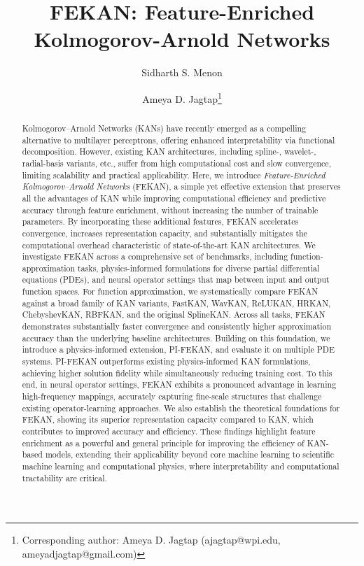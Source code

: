 \documentclass{article}
\title{\textbf{FEKAN: Feature-Enriched Kolmogorov-Arnold Networks}}
\author[]{Sidharth S. Menon}
\author[]{Ameya D. Jagtap\thanks{Corresponding author: Ameya D. Jagtap (ajagtap@wpi.edu, ameyadjagtap@gmail.com)}}
\affil[]{\textit{\small{Aerospace Engineering Department, Worcester Polytechnic Institute, Worcester, MA 01609, USA.}}}
\date{}
\begin{document}
\maketitle
\begin{abstract}
Kolmogorov–Arnold Networks (KANs) have recently emerged as a compelling alternative to multilayer perceptrons, offering enhanced interpretability via functional decomposition. However, existing KAN architectures, including spline-, wavelet-, radial-basis variants, etc., suffer from high computational cost and slow convergence, limiting scalability and practical applicability. Here, we introduce \textit{Feature-Enriched Kolmogorov–Arnold Networks} (FEKAN), a simple yet effective extension that preserves all the advantages of KAN while improving computational efficiency and predictive accuracy through feature enrichment, without increasing the number of trainable parameters. By incorporating these additional features, FEKAN accelerates convergence, increases representation capacity, and substantially mitigates the computational overhead characteristic of state-of-the-art KAN architectures. We investigate FEKAN across a comprehensive set of benchmarks, including function-approximation tasks, physics-informed formulations for diverse partial differential equations (PDEs), and neural operator settings that map between input and output function spaces. For function approximation, we systematically compare FEKAN against a broad family of KAN variants, FastKAN, WavKAN, ReLUKAN, HRKAN, ChebyshevKAN, RBFKAN, and the original SplineKAN. Across all tasks, FEKAN demonstrates substantially faster convergence and consistently higher approximation accuracy than the underlying baseline architectures.
Building on this foundation, we introduce a physics-informed extension, PI-FEKAN, and evaluate it on multiple PDE systems. PI-FEKAN outperforms existing physics-informed KAN formulations, achieving higher solution fidelity while simultaneously reducing training cost. To this end, in neural operator settings, FEKAN exhibits a pronounced advantage in learning high-frequency mappings, accurately capturing fine-scale structures that challenge existing operator-learning approaches. We also establish the theoretical foundations for FEKAN, showing its superior representation capacity compared to KAN, which contributes to improved accuracy and efficiency. These findings highlight feature enrichment as a powerful and general principle for improving the efficiency of KAN-based models, extending their applicability beyond core machine learning to scientific machine learning and computational physics, where interpretability and computational tractability are critical.
\end{abstract}
\end{document}

